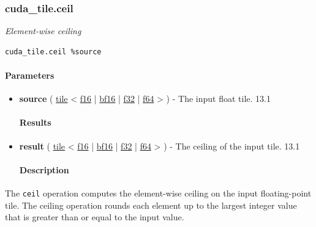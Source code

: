 \documentclass{article}
\begin{document}
\subsubsection{cuda\_tile.ceil}

\textit{Element-wise ceiling}


\begin{lstlisting}
cuda_tile.ceil %source
\end{lstlisting}

\paragraph{Parameters}

\begin{itemize}
\item \textbf{source} ( \href{https://docs.nvidia.com/cuda/tile-ir/latest/sections/types.html#type-tile}{tile} < \href{https://docs.nvidia.com/cuda/tile-ir/latest/sections/types.html#subsection-element-types}{f16} | \href{https://docs.nvidia.com/cuda/tile-ir/latest/sections/types.html#subsection-element-types}{bf16} | \href{https://docs.nvidia.com/cuda/tile-ir/latest/sections/types.html#subsection-element-types}{f32} | \href{https://docs.nvidia.com/cuda/tile-ir/latest/sections/types.html#subsection-element-types}{f64} > ) - The input float tile. 13.1


\paragraph{Results}

\item \textbf{result} ( \href{https://docs.nvidia.com/cuda/tile-ir/latest/sections/types.html#type-tile}{tile} < \href{https://docs.nvidia.com/cuda/tile-ir/latest/sections/types.html#subsection-element-types}{f16} | \href{https://docs.nvidia.com/cuda/tile-ir/latest/sections/types.html#subsection-element-types}{bf16} | \href{https://docs.nvidia.com/cuda/tile-ir/latest/sections/types.html#subsection-element-types}{f32} | \href{https://docs.nvidia.com/cuda/tile-ir/latest/sections/types.html#subsection-element-types}{f64} > ) - The ceiling of the input tile. 13.1


\paragraph{Description}

\end{itemize}
The \texttt{ceil} operation computes the element-wise ceiling on the input floating-point tile. The ceiling operation rounds each element up to the largest integer value that is greater than or equal to the input value.
\end{document}
